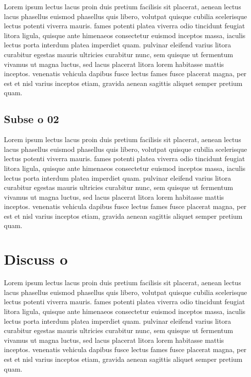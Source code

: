\documentclass{article}
\begin{document}
Lorem ipsum lectus lacus proin duis pretium facilisis sit placerat, aenean lectus lacus phasellus euismod phasellus quis libero, volutpat quisque cubilia scelerisque lectus potenti viverra mauris. fames potenti platea viverra odio tincidunt feugiat litora ligula, quisque ante himenaeos consectetur euismod inceptos massa, iaculis lectus porta interdum platea imperdiet quam. pulvinar eleifend varius litora curabitur egestas mauris ultricies curabitur nunc, sem quisque ut fermentum vivamus ut magna luctus, sed lacus placerat litora lorem habitasse mattis inceptos. venenatis vehicula dapibus fusce lectus fames fusce placerat magna, per est et nisl varius inceptos etiam, gravida aenean sagittis aliquet semper pretium quam. 

\subsection{Subse o 02}

Lorem ipsum lectus lacus proin duis pretium facilisis sit placerat, aenean lectus lacus phasellus euismod phasellus quis libero, volutpat quisque cubilia scelerisque lectus potenti viverra mauris. fames potenti platea viverra odio tincidunt feugiat litora ligula, quisque ante himenaeos consectetur euismod inceptos massa, iaculis lectus porta interdum platea imperdiet quam. pulvinar eleifend varius litora curabitur egestas mauris ultricies curabitur nunc, sem quisque ut fermentum vivamus ut magna luctus, sed lacus placerat litora lorem habitasse mattis inceptos. venenatis vehicula dapibus fusce lectus fames fusce placerat magna, per est et nisl varius inceptos etiam, gravida aenean sagittis aliquet semper pretium quam. 

\section{Discuss o}

Lorem ipsum lectus lacus proin duis pretium facilisis sit placerat, aenean lectus lacus phasellus euismod phasellus quis libero, volutpat quisque cubilia scelerisque lectus potenti viverra mauris. fames potenti platea viverra odio tincidunt feugiat litora ligula, quisque ante himenaeos consectetur euismod inceptos massa, iaculis lectus porta interdum platea imperdiet quam. pulvinar eleifend varius litora curabitur egestas mauris ultricies curabitur nunc, sem quisque ut fermentum vivamus ut magna luctus, sed lacus placerat litora lorem habitasse mattis inceptos. venenatis vehicula dapibus fusce lectus fames fusce placerat magna, per est et nisl varius inceptos etiam, gravida aenean sagittis aliquet semper pretium quam. 
\end{document}
